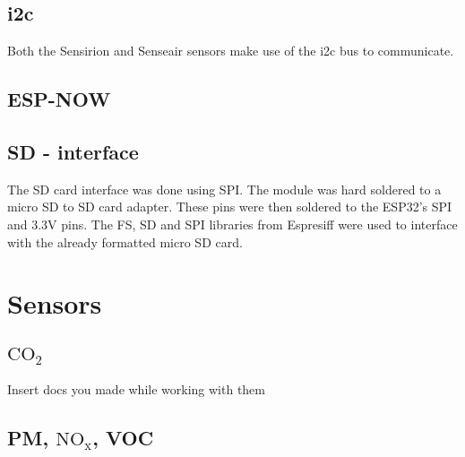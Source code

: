 \subsection{i2c}
Both the Sensirion and Senseair sensors make use of the i2c bus to communicate. 

\subsection{ESP-NOW}


\subsection{SD - interface}
The SD card interface was done using SPI. The module was hard soldered to a micro SD to SD card adapter. These pins were then soldered to the ESP32's SPI and 3.3V pins.
The FS, SD and SPI libraries from Espresiff were used to interface with the already formatted micro SD card.




\section{Sensors}
\subsection{$\mathrm{CO_2}$}
{\color{red} \huge Insert docs you made while working with them}



\subsection{PM, $\mathrm{NO_x}$, VOC}

